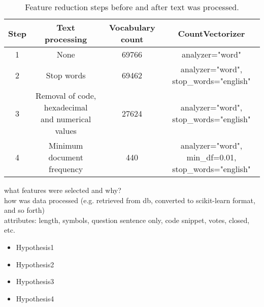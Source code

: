 \begin{table}[tbp]
	\centering
	\begin{tabular}{| c | c | c | c |}
		\hline
		Step & Text processing  & Vocabulary count & CountVectorizer  \\ \hline
		1 	& None 									& 69766 	& analyzer="word" \\ \hline
		2 	& Stop words 							& 69462 	& 
			\shortstack{analyzer="word", \\ stop\_words="english"} \\ \hline
		3 	& \shortstack{Removal of code, 
			hexadecimal \\ and numerical values} 	& 27624 	& 
			\shortstack{analyzer="word", \\ stop\_words="english"} \\ \hline
		4 	& Minimum document frequency 			& 440 		& 
				\shortstack{analyzer="word", min\_df=0.01, \\ stop\_words="english"} \\ \hline
	\end{tabular}
	\caption{Feature reduction steps before and after text was processed.}
	\label{tab:feature_reduction}
\end{table}

what features were selected and why? \\
how was data processed (e.g. retrieved from db, converted to scikit-learn format, and so forth) \\
attributes: length, symbols, question sentence only, code snippet, votes, closed, etc.

\begin{itemize}
	\item Hypothesis1
	\item Hypothesis2
	\item Hypothesis3
	\item Hypothesis4
\end{itemize}

